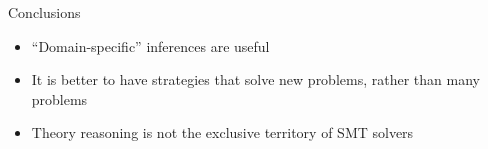 \begin{frame}{Conclusions}
  \begin{itemize}
  \item ``Domain-specific'' inferences are useful
  \item It is better to have strategies that solve new problems,
    rather than many problems
  \item Theory reasoning is not the exclusive territory of SMT solvers
  \end{itemize}
\end{frame}

